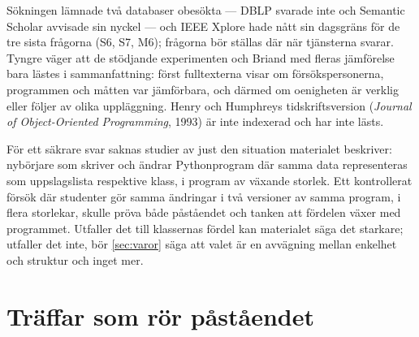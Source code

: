 Sökningen lämnade två databaser obesökta --- DBLP svarade inte och
Semantic Scholar avvisade sin nyckel --- och IEEE Xplore hade nått sin
dagsgräns för de tre sista frågorna (S6, S7, M6); frågorna bör ställas
där när tjänsterna svarar.  Tyngre väger att de stödjande experimenten
\autocite{HenryHumphrey1990,HenryHumphreyLewis1990,LowHuan1999,Lim2005} och
Briand med fleras jämförelse\autocite{Briand1997Maintainability} bara
lästes i sammanfattning: först fulltexterna visar om försökspersonerna,
programmen och måtten var jämförbara, och därmed om oenigheten är verklig
eller följer av olika uppläggning.  Henry och Humphreys tidskriftsversion
(\emph{Journal of Object-Oriented Programming}, 1993) är inte indexerad
och har inte lästs.

För ett säkrare svar saknas studier av just den situation materialet
beskriver: nybörjare som skriver och ändrar Pythonprogram där samma data
representeras som uppslagslista respektive klass, i program av växande
storlek.  Ett kontrollerat försök där studenter gör samma ändringar i
två versioner av samma program, i flera storlekar, skulle pröva både
påståendet och tanken att fördelen växer med programmet.  Utfaller det
till klassernas fördel kan materialet säga det starkare; utfaller det
inte, bör \cref{sec:varor} säga att valet är en avvägning mellan
enkelhet och struktur och inget mer.

\section{Träffar som rör påståendet}
\label{sec:und-traffar}


